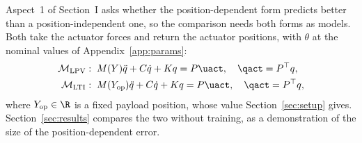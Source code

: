 Aspect~1 of Section~I asks whether the position-dependent form predicts
better than a position-independent one, so the comparison needs both forms
as models.
Both take the actuator forces and return the actuator positions, with
$\theta$ at the nominal values of Appendix~\ref{app:params}:
\begin{equation}
\begin{aligned}
  \mathcal M_{\mathrm{LPV}}&:\;
  M(Y)\ddot q+C\dot q+Kq=P\uact,\quad \qact=P^\top q,\\
  \mathcal M_{\mathrm{LTI}}&:\;
  M(Y_{\mathrm{op}})\ddot q+C\dot q+Kq=P\uact,\quad \qact=P^\top q,
\end{aligned}
\label{eq:baseline_models}
\end{equation}
where $Y_{\mathrm{op}}\in\R$ is a fixed payload position, whose value
Section~\ref{sec:setup} gives.
Section~\ref{sec:results} compares the two without training, as a demonstration of the
size of the position-dependent error.

